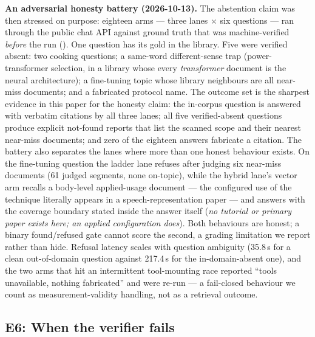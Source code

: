 \textbf{An adversarial honesty battery (2026-10-13).} The abstention claim
was then stressed on purpose: eighteen arms --- three lanes $\times$ six
questions --- ran through the public chat API against ground truth that was
machine-verified \emph{before} the run
(). One question has its gold in the library. Five were verified
absent: two cooking questions; a same-word different-sense trap (power-transformer
selection, in a library whose every \emph{transformer} document is the
neural architecture); a fine-tuning topic whose library neighbours are all
near-miss documents; and a fabricated protocol name. The outcome set is the
sharpest evidence in this paper for the honesty claim: the in-corpus
question is answered with verbatim citations by all three lanes; all five
verified-absent questions produce explicit not-found reports that list the
scanned scope and their nearest near-miss documents; and zero of the
eighteen answers fabricate a citation. The battery also separates the lanes
where more than one honest behaviour exists. On the fine-tuning question
the ladder lane refuses after judging six near-miss documents (61 judged
segments, none on-topic), while the hybrid lane's vector arm recalls a
body-level applied-usage document --- the configured use of the technique
literally appears in a speech-representation paper --- and answers with the
coverage boundary stated inside the answer itself (\emph{no tutorial or
primary paper exists here; an applied configuration does}). Both behaviours
are honest; a binary found/refused gate cannot score the second, a grading
limitation we report rather than hide. Refusal latency scales with question
ambiguity (35.8\,s for a clean out-of-domain question against 217.4\,s for
the in-domain-absent one), and the two arms that hit an intermittent
tool-mounting race reported ``tools unavailable, nothing fabricated'' and
were re-run --- a fail-closed behaviour we count as measurement-validity
handling, not as a retrieval outcome.

\subsection{E6: When the verifier fails}
\label{sec:e6}
\label{sec:inflation}\label{sec:eval-verify}   %

